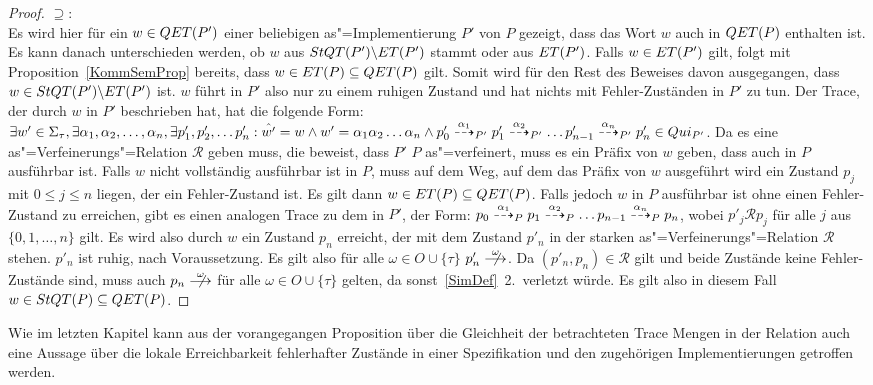 \begin{proof}
  \glqq$\supseteq$\grqq{}:\\
  Es wird hier für ein $w\in QET (P')$ einer beliebigen as"=Implementierung
  $P'$ von $P$ gezeigt, dass das Wort $w$ auch in $QET (P)$ enthalten ist. Es
  kann danach unterschieden werden, ob $w$ aus $StQT (P')\backslash ET (P')$
  stammt oder aus $ET (P')$. Falls $w\in ET (P')$ gilt, folgt mit
  Proposition~\ref{KommSemProp} bereits, dass $w\in ET (P) \subseteq QET (P)$
  gilt. Somit wird für den Rest des Beweises davon ausgegangen, dass $w\in StQT
  (P')\backslash ET (P')$ ist. $w$ führt in $P'$ also nur zu einem ruhigen
  Zustand und hat nichts mit Fehler-Zuständen in $P'$ zu tun. Der Trace, der
  durch $w$ in $P'$ beschrieben hat, hat die folgende Form: $\exists w'\in
  \Sigma _{\tau}, \exists \alpha _1, \alpha _2, \dots , \alpha _n, \exists
  p'_1, p'_2, \dots p'_n : \hat{w'} = w \land w' = \alpha _1\alpha _2\dots
  \alpha _n \land p'_0 \may[\alpha _1]_{P'} p'_1 \may[\alpha _2]_{P'} \dots
  p'_{n-1} \may[\alpha _n]_{P'} p'_n \in Qui _{P'}$. Da es eine
  as"=Verfeinerungs"=Relation $\mathcal{R}$ geben muss, die beweist, dass $P'$
  $P$ as"=verfeinert, muss es ein Präfix von $w$ geben, dass auch in $P$
  ausführbar ist. Falls $w$ nicht vollständig ausführbar ist in $P$, muss auf
  dem Weg, auf dem das Präfix von $w$ ausgeführt wird ein Zustand $p_j$ mit $0
  \leq j \leq n$ liegen, der ein Fehler-Zustand ist. Es gilt dann $w\in ET
  (P)\subseteq QET (P)$. Falls jedoch $w$ in $P$ ausführbar ist ohne einen
  Fehler-Zustand zu erreichen, gibt es einen analogen Trace zu dem in $P'$, der
  Form: $p_0 \may[\alpha _1]_P p_1 \may[\alpha _2]_P \dots p_{n-1} \may[\alpha
  _n]_P p_n$, wobei $p'_j \mathcal{R} p_j$ für alle $j$ aus $\{0,1,\dots ,n\}$
  gilt. Es wird also durch $w$ ein Zustand $p_n$ erreicht, der mit dem Zustand
  $p'_n$ in der starken as"=Verfeinerungs"=Relation $\mathcal{R}$ stehen.
  $p'_n$ ist ruhig, nach Voraussetzung. Es gilt also für alle $\omega\in O\cup
  \{\tau\}$ $p'_n\nmust[\omega]$. Da $(p'_n,p_n) \in\mathcal{R}$ gilt und beide
  Zustände keine Fehler-Zustände sind, muss auch $p_n\nmust[\omega]$ für alle
  $\omega\in O\cup \{\tau\}$ gelten, da sonst~\ref{SimDef}~2.\ verletzt würde.
  Es gilt also in diesem Fall $w\in StQT (P)\subseteq QET (P)$.
\end{proof}

Wie im letzten Kapitel kann aus der vorangegangen Proposition über die
Gleichheit der betrachteten Trace Mengen in der Relation \QRel{} auch eine
Aussage über die lokale Erreichbarkeit \glqq fehlerhafter Zustände\grqq{} in
einer Spezifikation und den zugehörigen Implementierungen getroffen werden.

